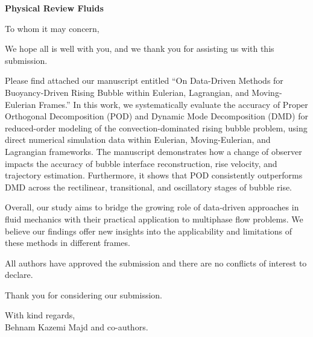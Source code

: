 \documentclass[a4paper,11pt]{letter}
\begin{document}
	\begin{letter}{\bf Physical Review Fluids}
		
		\opening{To whom it may concern,}
		
		We hope all is well with you, and we thank you for assisting us with this submission.
		
		Please find attached our manuscript entitled ``On Data-Driven Methods for Buoyancy-Driven Rising Bubble within Eulerian, Lagrangian, and Moving-Eulerian Frames.'' In this work, we systematically evaluate the accuracy of Proper Orthogonal Decomposition (POD) and Dynamic Mode Decomposition (DMD) for reduced-order modeling of the convection-dominated rising bubble problem, using direct numerical simulation data within Eulerian, Moving-Eulerian, and Lagrangian frameworks. The manuscript demonstrates how a change of observer impacts the accuracy of bubble interface reconstruction, rise velocity, and trajectory estimation. Furthermore, it shows that POD consistently outperforms DMD across the rectilinear, transitional, and oscillatory stages of bubble rise.
		
		Overall, our study aims to bridge the growing role of data-driven approaches in fluid mechanics with their practical application to multiphase flow problems. We believe our findings offer new insights into the applicability and limitations of these methods in different frames.
		
		All authors have approved the submission and there are no conflicts of interest to declare.
		
		Thank you for considering our submission.
		
		With kind regards,\\
		Behnam Kazemi Majd and co-authors.
		
	\end{letter}
\end{document}
